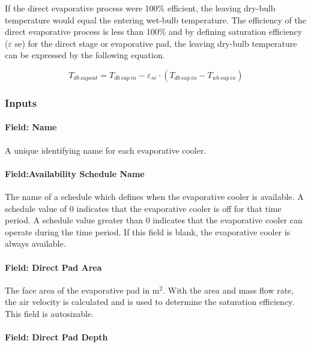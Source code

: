 If the direct evaporative process were 100\% efficient, the leaving dry-bulb temperature would equal the entering wet-bulb temperature. The efficiency of the direct evaporative process is less than 100\% and by defining saturation efficiency (\(\varepsilon\) se) for the direct stage or evaporative pad, the leaving dry-bulb temperature can be expressed by the following equation.

\begin{equation}
{T_{db\,supout}} = {T_{db\,sup\,in}} - {\varepsilon_{se}}\cdot \left( {{T_{db\,sup\,in}} - {T_{wb\,sup\,in}}} \right)
\end{equation}

\subsubsection{Inputs}\label{inputs-016}

\paragraph{Field: Name}\label{field-name-015}

A unique identifying name for each evaporative cooler.

\paragraph{Field:Availability Schedule Name}\label{fieldavailability-schedule-name}

The name of a schedule which defines when the evaporative cooler is available. A schedule value of 0 indicates that the evaporative cooler is off for that time period. A schedule value greater than 0 indicates that the evaporative cooler can operate during the time period. If this field is blank, the evaporative cooler is always available.

\paragraph{Field: Direct Pad Area}\label{field-direct-pad-area}

The face area of the evaporative pad in m\(^{2}\). With the area and mass flow rate, the air velocity is calculated and is used to determine the saturation efficiency. This field is autosizable.

\paragraph{Field: Direct Pad Depth}\label{field-direct-pad-depth}

